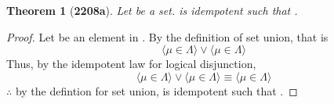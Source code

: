 \documentclass[preview]{standalone}
\newtheorem*{theorem*}{Theorem}
\begin{document}
\begin{theorem*}[\textbf{2208a}] \color{black}
    Let \bm{$\Lambda$} be a set. 
    \bm{$\Lambda$} is idempotent such that 
    \bm{$\Lambda \cup \Lambda = \Lambda$}.
\end{theorem*}
\begin{proof} \color{black}
    Let \bm{$\mu$} be an element in \bm{$\Lambda \cup \Lambda$}. 
    By the definition of set union, that is 
    \begin{equation*}
        \Big \langle \mu \in \Lambda \Big \rangle 
            \lor 
        \Big \langle \mu \in \Lambda \Big \rangle
    \end{equation*}
    Thus, by the idempotent law for logical disjunction, 
    \begin{equation*}
        \Big \langle \mu \in \Lambda \Big \rangle 
            \lor 
        \Big \langle \mu \in \Lambda \Big \rangle 
            \equiv 
        \Big \langle \mu \in \Lambda \Big \rangle
    \end{equation*}
    $\therefore$ by the defintion for set union,
    \bm{$\Lambda$} is idempotent such that 
    \bm{$\Lambda \cup \Lambda = \Lambda$}.
\color{lightgray} \end{proof}
\end{document}
